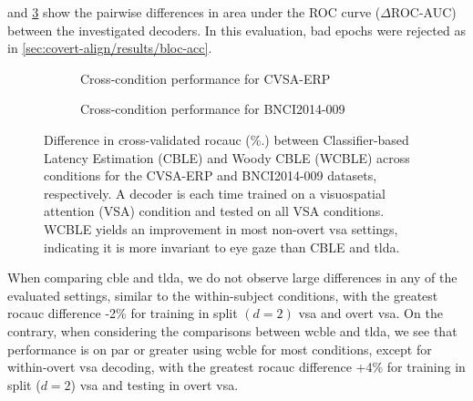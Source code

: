  and \cref{fig:covert-align/aloise2012-cross-eval} show
the pairwise differences in area under the ROC curve ($\Delta$ROC-AUC)
between the investigated decoders.
In this evaluation, bad epochs were rejected as in \cref{sec:covert-align/results/bloc-acc}.
\begin{figure}[t!]
  \sffamily
  \footnotesize
	\begin{subfigure}{\textwidth}
    \hspace{-.5in}
		\caption{Cross-condition performance for CVSA-ERP}
		\label{fig:covert-align/covert-cross-eval}
	\end{subfigure}
	\begin{subfigure}{\textwidth}
    \hspace{-.5in}
		\caption{Cross-condition performance for BNCI2014-009}
		\label{fig:covert-align/aloise2012-cross-eval}
	\end{subfigure}%
  \caption[Cross-condition classifier performance]{
    Difference in cross-validated  \ac{rocauc} (\%.) between Classifier-based Latency Estimation
    (CBLE) and Woody CBLE (WCBLE) across conditions for the CVSA-ERP and
    BNCI2014-009 datasets, respectively.
    A decoder is each	time trained on a visuospatial attention (VSA) condition
    and tested on all VSA conditions.
    WCBLE yields an improvement in most
		non-overt \ac{vsa} settings, indicating it is more invariant to eye gaze than
    CBLE and \ac{tlda}.
  }
\end{figure}
When comparing \ac{cble} and \ac{tlda}, we do not observe large differences in any of the
evaluated settings, similar to the within-subject conditions, with the greatest
\ac{rocauc} difference -2\% for training in split $(d=2)$ \ac{vsa} and overt \ac{vsa}.
On the contrary, when considering the comparisons between \ac{wcble} and \ac{tlda}, we
see that performance is on par or greater using \ac{wcble} for most conditions,
except for within-overt \ac{vsa} decoding, with the greatest \ac{rocauc}
difference +4\% for training in split ($d=2$) \ac{vsa} and testing in overt
\ac{vsa}.


